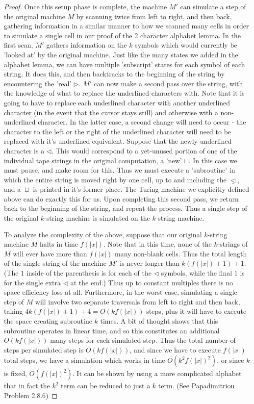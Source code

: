 \documentclass{article}
\theoremstyle{definition}
\theoremstyle{plain}
\theoremstyle{theorem}
\begin{document}
\begin{proof}
	Once this setup phase is complete, the machine $M'$ can simulate a step of the original machine $M$ by scanning twice from left to right, and then back, gathering information in a similar manner to how we scanned many cells in order to simulate a single cell in our proof of the 2 character alphabet lemma. In the first scan, $M'$ gathers information on the $k$ symbols which would currently be 'looked at' by the original machine. Just like the many states we added in the alphabet lemma, we can have multiple 'subscript' states for each symbol of each string. It does this, and then backtracks to the beginning of the string by encountering the 'real' $\triangleright$. $M'$ can now make a second pass over the string, with the knowledge of what to replace the underlined characters with. Note that it is going to have to replace each underlined character with another underlined character (in the event that the cursor stays still) and otherwise with a non-underlined character. In the latter case, a second change will need to occur - the character to the left or the right of the underlined character will need to be replaced with it's underlined equivalent. Suppose that the newly underlined character is a $\triangleleft$. This would correspond to a yet-unused portion of one of the individual tape strings in the original computation, a 'new' $\sqcup$. In this case we must pause, and make room for this. Thus we must execute a 'subroutine' in which the entire string is moved right by one cell, up to and including the $\underline{\triangleleft}$, and a $\underline{\sqcup}$ is printed in it's former place. The Turing machine we explicitly defined above can do exactly this for us. Upon completing this second pass, we return back to the beginning of the string, and repeat the process. Thus a single step of the original $k$-string machine is simulated on the $k$ string machine.
	\par To analyze the complexity of the above, suppose that our original $k$-string machine $M$ halts in time $f(|x|)$. Note that in this time, none of the $k$-strings of $M$ will ever have more than $f(|x|)$ many non-blank cells. Thus the total length of the single string of the machine $M'$ is never longer than $k(f(|x|)+1)+1$. (The $1$ inside of the parenthesis is for each of the $\triangleleft$ symbols, while the final $1$ is for the single extra $\triangleleft$ at the end.) Thus up to constant multiples there is no space efficiency loss at all. Furthermore, in the worst case, simulating a single step of $M$ will involve two separate traversals from left to right and then back, taking $4k(f(|x|)+1)+4 = O(kf(|x|))$ steps, plus it will have to execute the space creating subroutine $k$ times. A bit of thought shows that this subroutine operates in linear time, and so this constitutes an additional $O(kf(|x|))$ many steps for each simulated step. Thus the total number of steps per simulated step is $O(kf(|x|))$, and since we have to execute $f(|x|)$ total steps, we have a simulation which works in time $O(k^2f(|x|)^2)$, or since $k$ is fixed, $O(f(|x|)^2)$. It can be shown by using a more complicated alphabet that in fact the $k^2$ term can be reduced to just a $k$ term. (See Papadimitriou Problem 2.8.6)
\end{proof}
\end{document}
